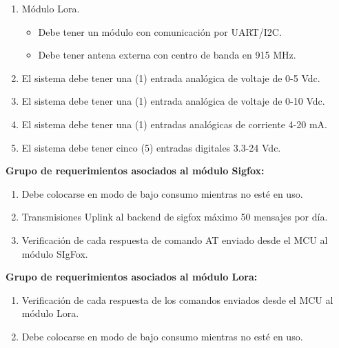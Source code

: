 \begin{enumerate}
\begin{itemize}
		\end{itemize}

	\item Módulo Lora.

		\begin{itemize}

			\item Debe tener un módulo con comunicación por UART/I2C.

			\item Debe tener antena externa con centro de banda en 915 MHz.

		\end{itemize}

		\item El sistema debe tener una (1) entrada analógica de voltaje de 0-5 Vdc.
		
		\item El sistema debe tener una (1) entrada analógica de voltaje de 0-10 Vdc.

		\item El sistema debe tener una (1) entradas analógicas de corriente 4-20 mA.

		\item El sistema debe tener cinco (5) entradas digitales 3.3-24 Vdc.

\end{enumerate}



\textbf{Grupo de requerimientos asociados al módulo Sigfox:}

	\begin{enumerate}

		\item Debe colocarse en modo de bajo consumo mientras no esté en uso.

		\item Transmisiones Uplink al backend de sigfox máximo 50 mensajes por día.

		\item Verificación de cada respuesta de comando AT enviado desde el MCU al módulo SIgFox.

	\end{enumerate}





\textbf{Grupo de requerimientos asociados al módulo Lora:}

	\begin{enumerate}

		\item Verificación de cada respuesta de los comandos enviados desde el MCU al módulo Lora.

		\item Debe colocarse en modo de bajo consumo mientras no esté en uso.

	\end{enumerate}



